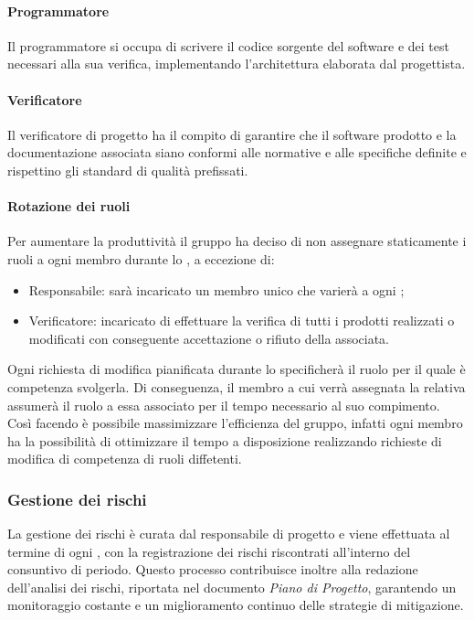 \paragraph{Programmatore}
Il programmatore si occupa di scrivere il codice sorgente del software e dei test necessari alla sua verifica, implementando l'architettura elaborata dal progettista.

\paragraph{Verificatore}
Il verificatore di progetto ha il compito di garantire che il software prodotto e la documentazione associata siano conformi alle normative e alle specifiche definite e rispettino gli standard di qualità prefissati.

\paragraph{Rotazione dei ruoli}
Per aumentare la produttività il gruppo ha deciso di non assegnare staticamente i ruoli a ogni membro durante lo , a eccezione di:
\begin{itemize}
    \item Responsabile: sarà incaricato un membro unico che varierà a ogni ;
    \item Verificatore: incaricato di effettuare la verifica di tutti i prodotti realizzati o modificati con conseguente accettazione o rifiuto della  associata.
\end{itemize}  
Ogni richiesta di modifica pianificata durante lo  specificherà il ruolo per il quale è competenza svolgerla.
Di conseguenza, il membro a cui verrà assegnata la relativa  assumerà il ruolo a essa associato per il tempo necessario al suo compimento.
Così facendo è possibile massimizzare l'efficienza del gruppo, infatti ogni membro ha la possibilità di ottimizzare il tempo a disposizione realizzando richieste di modifica di competenza di ruoli diffetenti.

\subsubsection{Gestione dei rischi}

La gestione dei rischi è curata dal responsabile di progetto e viene effettuata al termine di ogni , con la registrazione dei rischi riscontrati all'interno del consuntivo di periodo. 
Questo processo contribuisce inoltre alla redazione dell'analisi dei rischi, riportata nel documento \textit{Piano di Progetto}, garantendo un monitoraggio costante e un miglioramento continuo delle strategie di mitigazione.

